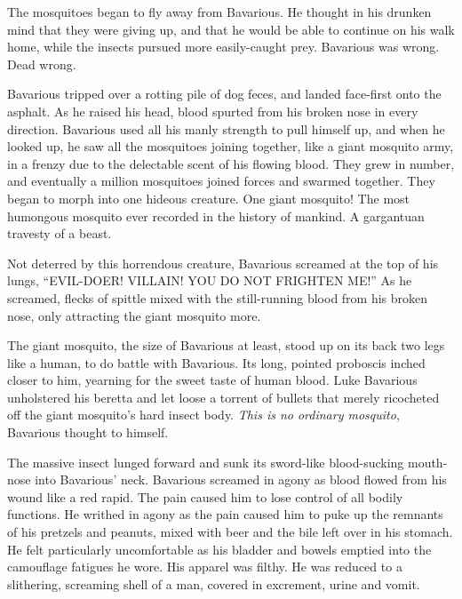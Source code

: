 The mosquitoes began to fly away from Bavarious. He thought in his
drunken mind that they were giving up, and that he would be able to
continue on his walk home, while the insects pursued more
easily-caught prey. Bavarious was wrong. Dead wrong.



Bavarious tripped over a rotting pile of dog feces, and landed
face-first onto the asphalt. As he raised his head, blood spurted
from his broken nose in every direction. Bavarious used all his
manly strength to pull himself up, and when he looked up, he saw
all the mosquitoes joining together, like a giant mosquito army, in
a frenzy due to the delectable scent of his flowing blood. They
grew in number, and eventually a million mosquitoes joined forces
and swarmed together. They began to morph into one hideous
creature. One giant mosquito! The most humongous mosquito ever
recorded in the history of mankind. A gargantuan travesty of a
beast.



Not deterred by this horrendous creature, Bavarious screamed at the
top of his lungs, ``EVIL-DOER! VILLAIN! YOU DO NOT FRIGHTEN
ME!'' As he screamed, flecks of spittle mixed with the
still-running blood from his broken nose, only attracting the giant
mosquito more.



The giant mosquito, the size of Bavarious at least, stood up on its
back two legs like a human, to do battle with Bavarious. Its long,
pointed proboscis inched closer to him, yearning for the sweet
taste of human blood. Luke Bavarious unholstered his beretta and
let loose a torrent of bullets that merely ricocheted off the giant
mosquito's hard insect body. {\em This is no ordinary
mosquito}, Bavarious thought to himself.



The massive insect lunged forward and sunk its sword-like
blood-sucking mouth-nose into Bavarious' neck. Bavarious
screamed in agony as blood flowed from his wound like a red rapid.
The pain caused him to lose control of all bodily functions. He
writhed in agony as the pain caused him to puke up the remnants of
his pretzels and peanuts, mixed with beer and the bile left over in
his stomach. He felt particularly uncomfortable as his bladder and
bowels emptied into the camouflage fatigues he wore. His apparel
was filthy. He was reduced to a slithering, screaming shell of a
man, covered in excrement, urine and vomit.



